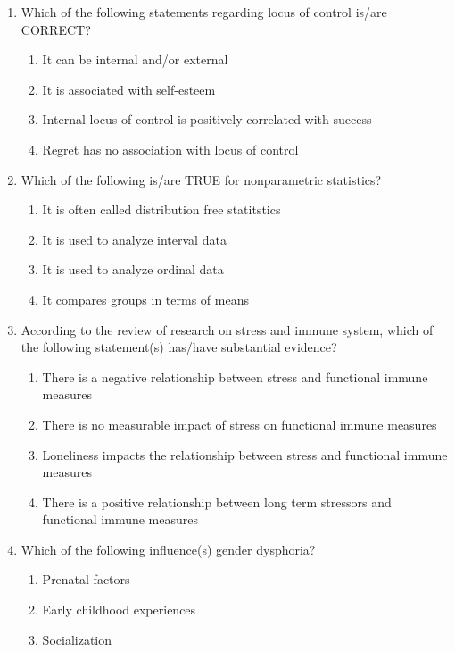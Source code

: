 \documentclass[12pt]{article}
\theoremstyle{remark}
\begin{document}
\begin{enumerate}
\begin{enumerate}
\begin{multicols}{2}
	\end{multicols} \end{enumerate}
\hfill{}
\item Which of the following statements regarding locus of control is/are CORRECT?
\begin{enumerate}
    \item It can be internal and/or external
    \item It is associated with self-esteem
    \item Internal locus of control is positively correlated with success
    \item Regret has no association with locus of control
\end{enumerate}
\hfill{}
\item Which of the following is/are TRUE for nonparametric statistics?
\begin{enumerate}
    \item It is often called distribution free statitstics
    \item It is used to analyze interval data
    \item It is used to analyze ordinal data
    \item It compares groups in terms of means
\end{enumerate}
\hfill{}
\item According to the review of research on stress and immune system, which of the following statement(s) has/have substantial evidence?
\begin{enumerate}
    \item There is a negative relationship between stress and functional immune measures
    \item There is no measurable impact of stress on functional immune measures
    \item Loneliness impacts the relationship between stress and functional immune measures  
    \item There is a positive relationship between long term stressors and functional immune measures
\end{enumerate}
\hfill{}
\item Which of the following influence(s) gender dysphoria?
\begin{enumerate}
    \item Prenatal factors
    \item Early childhood experiences
    \item Socialization

\end{enumerate}
\end{enumerate}
\end{document}

